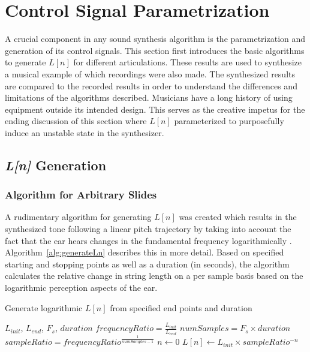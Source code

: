 \documentclass[../main.tex]{subfiles}
\begin{document}
\clearpage

\section{Control Signal Parametrization}
A crucial component in any sound synthesis algorithm is the parametrization and generation of its control signals. This section first introduces the basic algorithms to generate $L[n]$ for different articulations. These results are used to synthesize a musical example of which recordings were also made. The synthesized results are compared to the recorded results in order to understand the differences and limitations of the algorithms described. Musicians have a long history of using equipment outside its intended design. This serves as the creative impetus for the ending discussion of this section where $L[n]$ parameterized to purposefully induce an unstable state in the synthesizer.

\subsection{\emph{L[n]} Generation}
\subsubsection{Algorithm for Arbitrary Slides}
A rudimentary algorithm for generating $L[n]$ was created which results in the synthesized tone following a linear pitch trajectory by taking into account the fact that the ear hears changes in the fundamental frequency logarithmically . Algorithm~\ref{alg:generateLn} describes this in more detail. Based on specified starting and stopping points as well as a duration (in seconds), the algorithm calculates the relative change in string length on a per sample basis based on the logarithmic perception aspects of the ear.

\begin{algorithm}
\caption{Generate logarithmic $L[n]$ from specified end points and duration}
\label{alg:generateLn}
\begin{algorithmic}
\Require $L_{init}$, $L_{end}$, $F_s$, $duration$
\State $frequencyRatio = \frac{L_{init}}{L_{end}}$
\State $numSamples = F_s \times duration$
\State $sampleRatio = frequencyRatio^{\frac{1}{numSamples-1}}$ 
\State $n \gets 0$
    \State $L[n] \gets L_{init} \times sampleRatio^{-n}$
\EndFor
\end{algorithmic}
\end{algorithm}
\end{document}
